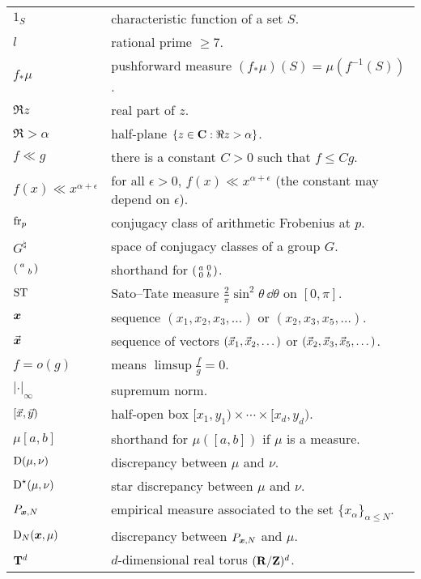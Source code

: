 \documentclass[phd,tocprelim]{cornell}
\begin{document}
\contentspage





\symlist

\begin{tabular}{ll}
$1_S$     
	& characteristic function of a set $S$. \\
$l$       
	& rational prime $\geqslant 7$. \\
$f_\ast\mu$
	& pushforward measure $(f_\ast\mu)(S) = \mu(f^{-1}(S))$. \\
$\Re z$
	& real part of $z$. \\
$\Re > \alpha$
	& half-plane $\{z\in \mathbf{C} : \Re z > \alpha\}$. \\
$f \ll g$ 
	& there is a constant $C>0$ such that $f \leqslant C g$. \\
$f(x) \ll x^{\alpha+\epsilon}$ 
	& for all $\epsilon>0$, $f(x) \ll x^{\alpha+\epsilon}$ (the constant may depend on $\epsilon$). \\
$\mathrm{fr}_p$
	& conjugacy class of arithmetic Frobenius at $p$. \\
$G^\natural$
	& space of conjugacy classes of a group $G$. \\
$\left(\begin{smallmatrix} a &  \\  & b \end{smallmatrix}\right)$
	& shorthand for $\left(\begin{smallmatrix} a & 0 \\ 0 & b \end{smallmatrix}\right)$. \\
$\mathrm{ST}$
	& Sato--Tate measure $\frac{2}{\pi} \sin^2\theta\, \dd\theta$ on $[0,\pi]$. \\
${\boldsymbol x}$
	& sequence $(x_1,x_2,x_3,\dots)$ or $(x_2,x_3,x_5,\dots)$. \\
$\vec{\boldsymbol x}$
	& sequence of vectors $(\vec{x}_1,\vec{x}_2,\dots)$ or $(\vec{x}_2,\vec{x}_3,\vec{x}_5,\dots)$. \\
$f = o(g)$
	& means $\limsup \frac f g = 0$. \\
$|\cdot|_\infty$
	& supremum norm. \\
$[\vec{x},\vec{y})$
	& half-open box $[x_1,y_1) \times \cdots \times [x_d,y_d)$. \\
$\mu[a,b]$
	& shorthand for $\mu([a,b])$ if $\mu$ is a measure. \\
$\operatorname{D}(\mu,\nu)$
	& discrepancy between $\mu$ and $\nu$. \\
$\operatorname{D}^\star(\mu,\nu)$
	& star discrepancy between $\mu$ and $\nu$. \\
$P_{{\boldsymbol x},N}$
	& empirical measure associated to the set $\{x_\alpha\}_{\alpha\leqslant N}$. \\
$\operatorname{D}_N({\boldsymbol x},\mu)$
	& discrepancy between $P_{{\boldsymbol x},N}$ and $\mu$. \\
$\mathbf{T}^d$
	& $d$-dimensional real torus $(\mathbf{R}/\mathbf{Z})^d$. \\

\end{tabular}
\end{document}
